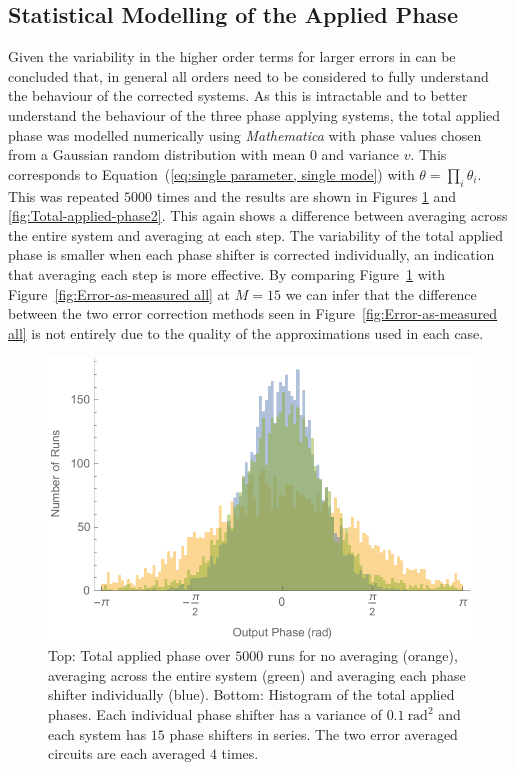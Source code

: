 \documentclass[aps,pra,twocolumn,superscriptaddress,numerical,floatfix]{revtex4-1}
\begin{document}


\subsection{Statistical Modelling of the Applied Phase\label{Statistical Modelling of the Applied Phase}}

Given the variability in the higher order terms for larger errors in can be concluded that, in general all orders need to be considered to fully understand the behaviour of the corrected systems. As this is intractable and to better understand the behaviour of the three phase applying systems, the total applied phase was modelled numerically using \textit{Mathematica} with phase values chosen from a Gaussian random distribution with mean $0$ and variance $v$. This corresponds to Equation~(\ref{eq:single parameter, single mode}) with $\theta=\prod_{i}\theta_{i}$. This was repeated $5000$ times and the results are shown in Figures \ref{fig:Total-applied-phase1} and \ref{fig:Total-applied-phase2}. This again shows a difference between averaging across the entire system and averaging at each step. The variability of the total applied phase is smaller when each phase shifter is corrected individually, an indication that averaging each step is more effective. By comparing Figure~\ref{fig:Total-applied-phase1} with Figure~\ref{fig:Error-as-measured all} at $M=15$ we can infer that the difference between the two error correction methods seen in Figure~\ref{fig:Error-as-measured all} is not entirely due to the quality of the approximations used in each case.
%
\begin{figure}
\centerline{\includegraphics[width=\columnwidth]{totphase1.pdf}}
\caption{Top: Total applied phase over $5000$ runs for no averaging (orange), averaging across the entire system (green) and averaging each phase shifter individually (blue). Bottom: Histogram of the total applied phases. Each individual phase shifter has a variance of $0.1\ \textrm{rad}^{2}$ and each system has $15$ phase shifters in series. The two error averaged circuits are each averaged $4$ times. \label{fig:Total-applied-phase1}}
\end{figure}
\end{document}
